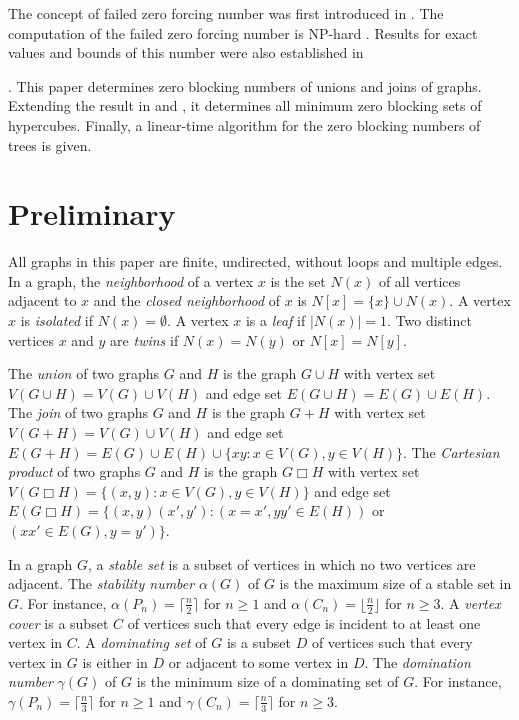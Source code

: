 \documentclass[preprint,12pt]{elsarticle}
\begin{document}
The concept of failed zero forcing number was first introduced in \cite{2015fjs}.
The computation of the failed zero forcing number is NP-hard \cite{2017s}.
Results for exact values and bounds of this number were also established in
{\cite{2024agm,2016ajps,2020bccknt,2024c,2017f,2021grtn,
2024grtn,2020ksv,2023ktn,2025LLc,2020paA,2020paB,2023su}.
This paper determines zero blocking numbers of unions and joins of graphs.
Extending the result in \cite{2024agm} and \cite{2024c}, it determines all minimum zero blocking sets of hypercubes.
Finally, a linear-time algorithm for the zero blocking numbers of trees is given.

\section{Preliminary}

All graphs in this paper are finite, undirected, without loops and multiple edges.
In a graph, the {\em neighborhood} of a vertex $x$ is the set $N(x)$ of all vertices adjacent to $x$ and the {\em closed neighborhood} of $x$ is $N[x]=\{x\}\cup N(x)$.
A vertex $x$ is {\em isolated} if $N(x)=\emptyset$.
A vertex $x$ is a {\em leaf} if $|N(x)|=1$.
Two distinct vertices $x$ and $y$ are {\em twins} if $N(x)=N(y)$ or $N[x]=N[y]$.

The {\em union} of two graphs $G$ and $H$ is the graph $G \cup H$ with
vertex set $V(G\cup H)=V(G)\cup V(H)$ and
edge set $E(G\cup H)=E(G)\cup E(H)$.
The {\em join} of two graphs $G$ and $H$ is the graph $G + H$ with
vertex set $V(G+H)=V(G)\cup V(H)$ and
edge set $E(G+H)=E(G)\cup E(H)\cup\{xy: x\in V(G), y\in V(H)\}$.
The {\em Cartesian product} of two graphs $G$ and $H$ is the graph $G \Box H$ with
vertex set $V(G\Box H)=\{(x,y): x\in V(G), y\in V(H)\}$ and
edge set $E(G\Box H)=\{(x,y) (x',y'): (x=x', yy'\in E(H))$ or $(xx'\in E(G), y=y')\}$.

In a graph $G$, a {\em stable set} is a subset of vertices
in which no two vertices are adjacent.
The {\em stability number} $\alpha(G)$ of $G$
is the maximum size of a stable set in $G$.
For instance,
$\alpha(P_n)=\lceil \frac{n}{2} \rceil$ for $n\ge 1$ and
$\alpha(C_n)=\lfloor \frac{n}{2} \rfloor$ for $n\ge 3$.
A {\em vertex cover} is a subset $C$ of vertices
such that every edge is incident to at least one vertex in $C$.
A {\em dominating set} of $G$ is a subset $D$ of vertices
such that every vertex in $G$ is either in $D$
or adjacent to some vertex in $D$.
The {\em domination number} $\gamma(G)$ of $G$
is the minimum size of a dominating set of $G$.
For instance,
$\gamma(P_n)=\lceil \frac{n}{3} \rceil$ for $n\ge 1$ and
$\gamma(C_n)=\lceil \frac{n}{3} \rceil$ for $n\ge 3$.

}
\end{document}
